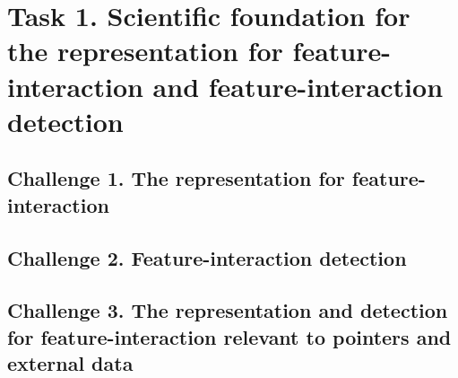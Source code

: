 \section{Task 1. Scientific foundation for the representation for feature-interaction and feature-interaction detection}
\label{task1-section}

\subsection{Challenge 1. The representation for feature-interaction}

\subsection{Challenge 2. Feature-interaction detection}

\subsection{Challenge 3. The representation and detection for feature-interaction relevant to pointers and external data}